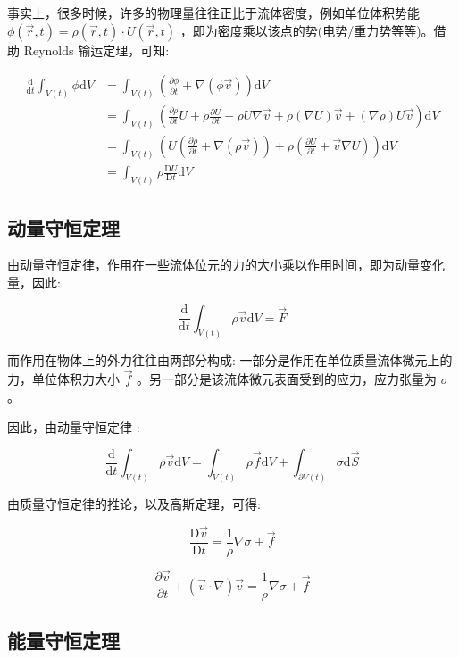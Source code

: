 \documentclass[fontset=windows]{article}
\begin{document}
事实上，很多时候，许多的物理量往往正比于流体密度，例如单位体积势能 $\phi(\vec{r},t) = \rho(\vec{r},t) \cdot U(\vec{r},t) $ ，即为密度乘以该点的势(电势/重力势等等)。借助 Reynolds 输运定理，可知:

$$
\begin{aligned}
\frac{\mathrm{d}}{\mathrm{d}t} \int_{V(t)} \phi \mathrm{d}V
    &= \int_{V(t)} (\frac{\partial \phi}{\partial t} + \nabla (\phi \vec{v})) \mathrm{d}V \\
    &= \int_{V(t)} (\frac{\partial \rho}{\partial t} U + \rho \frac{\partial U}{\partial t} 
        + \rho U \nabla \vec{v} + \rho (\nabla U) \vec {v} +  (\nabla \rho) U  \vec{v} ) \mathrm{d}V \\
    &= \int_{V(t)} (U (\frac{\partial \rho}{\partial t} + \nabla (\rho \vec{v}))
        + \rho (\frac{\partial U}{\partial t} + \vec {v} \nabla U ) )\mathrm{d}V \\
    &= \int_{V(t)} \rho \frac{\mathrm{D}U}{\mathrm{D}t} \mathrm{d}V
\end{aligned}
$$

\subsection{动量守恒定理}

由动量守恒定律，作用在一些流体位元的力的大小乘以作用时间，即为动量变化量，因此:

$$
\frac{\mathrm{d}}{\mathrm{d}t} \int_{V(t)} \rho \vec{v} \mathrm{d}V
= \vec{F}
$$

而作用在物体上的外力往往由两部分构成: 一部分是作用在单位质量流体微元上的力，单位体积力大小 $\vec{f}$ 。另一部分是该流体微元表面受到的应力，应力张量为 $\sigma$ 。

因此，由动量守恒定律 :

$$
\frac{\mathrm{d}}{\mathrm{d}t} \int_{V(t)} \rho \vec{v} \mathrm{d}V
= \int_{V(t)} \rho \vec {f} \mathrm{d}V + \int_{\partial V(t)} \sigma \mathrm{d}\vec{S}
$$

由质量守恒定律的推论，以及高斯定理，可得:

$$
\frac{\mathrm{D}\vec{v}}{\mathrm{D}t} = \frac{1}{\rho} \nabla {\sigma} + \vec{f}
$$

$$
\frac{\partial \vec{v}}{\partial t} + (\vec{v} \cdot \nabla) \vec{v} = \frac{1}{\rho} \nabla {\sigma} + \vec{f}
$$

\subsection{能量守恒定理}
\end{document}
